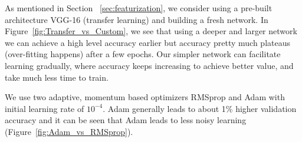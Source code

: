 \documentclass[journal, 12pt, onecolumn,draftclsnofoot]{IEEEtran}
\begin{document}
As mentioned in Section ~\ref{sec:featurization}, we consider using a pre-built architecture VGG-16 (transfer learning) and building a fresh network. In Figure~\ref{fig:Transfer_vs_Custom}, we see that using a deeper and larger network we can achieve a high level accuracy earlier but accuracy pretty much plateaus (over-fitting happens) after a few epochs. Our simpler network can facilitate learning gradually, where accuracy keeps increasing to achieve better value, and take much less time to train. 


\begin{figure}[h]
\end{figure}

We use two adaptive, momentum based optimizers RMSprop and Adam \cite{Adam} with initial learning rate of $10^{-4}$. Adam generally leads to about 1\% higher validation accuracy and it can be seen that Adam leads to less noisy learning (Figure~\ref{fig:Adam_vs_RMSprop}). 

\end{document}
